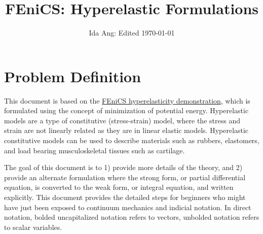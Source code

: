 \documentclass[12pt,3p]{article}
\begin{document}
\title{\Large{FEniCS: Hyperelastic Formulations} \vspace{-2ex}}
\author{Ida Ang: Edited \today}
\date{\vspace{-5ex}}
\maketitle

\tableofcontents
\newpage

\section{Problem Definition}
\vspace{-2ex}

This document is based on the \href{https://fenicsproject.org/olddocs/dolfin/1.4.0/python/demo/documented/hyperelasticity/python/documentation.html}{FEniCS hyperelasticity demonstration}, which is formulated using the concept of minimization of potential energy. Hyperelastic models are a type of constitutive (stress-strain) model, where the stress and strain are not linearly related as they are in linear elastic models. Hyperelastic constitutive models can be used to describe materials such as rubbers, elastomers, and load bearing musculoskeletal tissues such as cartilage. 

The goal of this document is to 1) provide more details of the theory, and 2) provide an alternate formulation where the strong form, or partial differential equation, is converted to the weak form, or integral equation, and written explicitly. This document provides the detailed steps for beginners who might have just been exposed to continuum mechanics and indicial notation. In direct notation, bolded uncapitalized notation refers to vectors, unbolded notation refers to scalar variables.
\end{document}
